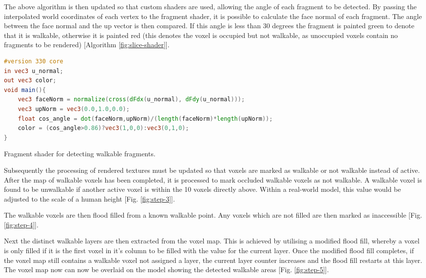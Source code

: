       The above algorithm is then updated so that custom shaders are used, allowing the angle of each fragment to be detected. By passing the interpolated world coordinates of each vertex to the fragment shader, it is possible to calculate the face normal of each fragment. The angle between the face normal and the up vector is then compared. If this angle is less than 30 degrees the fragment is painted green to denote that it is walkable, otherwise it is painted red (this denotes the voxel is occupied but not walkable, as unoccupied voxels contain no fragments to be rendered) [Algorithm \ref{fig:slice-shader}].

\begin{algorithm}
\begin{lstlisting}[language=GLSL]
#version 330 core
in vec3 u_normal;
out vec3 color;
void main(){
	vec3 faceNorm = normalize(cross(dFdx(u_normal), dFdy(u_normal)));
	vec3 upNorm = vec3(0.0,1.0,0.0);
	float cos_angle = dot(faceNorm,upNorm)/(length(faceNorm)*length(upNorm));
	color = (cos_angle>0.86)?vec3(1,0,0):vec3(0,1,0);
}
\end{lstlisting}
\protect\caption{\label{fig:slice-shader}Fragment shader for detecting walkable fragments.}
\end{algorithm}

      Subsequently the processing of rendered textures must be updated so that voxels are marked as walkable or not walkable instead of active. After the map of walkable voxels has been completed, it is processed to mark occluded walkable voxels as not walkable. A walkable voxel is found to be unwalkable if another active voxel is within the 10 voxels directly above. Within a real-world model, this value would be adjusted to the scale of a human height [Fig. \ref{fig:step-3}].

      The walkable voxels are then flood filled from a known walkable point. Any voxels which are not filled are then marked as inaccessible [Fig. \ref{fig:step-4}].
      
      Next the distinct walkable layers are then extracted from the voxel map. This is achieved by utilising a modified flood fill, whereby a voxel is only filled if it is the first voxel in it's column to be filled with the value for the current layer. Once the modified flood fill completes, if the voxel map still contains a walkable voxel not assigned a layer, the current layer counter increases and the flood fill restarts at this layer. The voxel map now can now be overlaid on the model showing the detected walkable areas [Fig. \ref{fig:step-5}].

